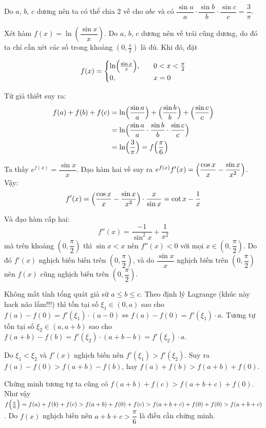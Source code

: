 \begin{solution}
    Do $a$, $b$, $c$ dương nên ta có thể chia 2 vế cho $abc$ và có
    $\dfrac{\sin a}{a} \cdot \dfrac{\sin b}{b} \cdot \dfrac{\sin c}{c} = \dfrac{3}{\pi}$.

    Xét hàm $f(x) = \ln (\dfrac{\sin x}{x})$. Do $a$, $b$, $c$ dương
    nên vế trái cũng dương, do đó ta chỉ cần xét các số trong khoảng
    $(0, \frac{\pi}{2})$ là đủ. Khi đó, đặt

    \[f(x) = \begin{cases} \ln\Bigl(\frac{\sin x}{x}\Bigr), \quad
        & 0 < x < \frac{\pi}{2} \\
        0, \quad & x = 0
    \end{cases}\]

    Từ giả thiết suy ra:
    \begin{align*}
        f(a) + f(b) + f(c) & = \ln \Bigl(\frac{\sin a}{a}\Bigr) 
        + \Bigl(\frac{\sin b}{b}\Bigr) + \Bigl(\frac{\sin c}{c}\Bigr) \\
        & = \ln\Bigl(\frac{\sin a}{a} \cdot \frac{\sin b}{b} 
        \cdot \frac{\sin c}{c}\Bigr) \\
        & = \ln\Bigl(\frac{3}{\pi}\Bigr) = f\Bigl(\frac{\pi}{6}\Bigr)
    \end{align*}

    Ta thấy $e^{f(x)} = \dfrac{\sin x}{x}$. Đạo hàm hai vế suy ra
    $e^{f(x)} f'(x) = \Bigl(\dfrac{\cos x}{x} - \dfrac{\sin x}{x^2}\Bigr)$.
    Vậy:
    \[f'(x) = \Bigl(\frac{\cos x}{x} - \frac{\sin x}{x^2}\Bigr)
    \cdot \frac{x}{\sin x} = \cot x - \frac{1}{x}\]

    Và đạo hàm cấp hai:
    \[f''(x) = \frac{-1}{\sin^2 x} + \frac{1}{x^2}\]
    mà trên khoảng $(0, \dfrac{\pi}{2})$ thì $\sin x < x$
    nên $f''(x) < 0$ với mọi $x \in (0, \dfrac{\pi}{2})$.
    Do đó $f'(x)$ nghịch biến biến trên $(0, \dfrac{\pi}{2})$,
    và do $\dfrac{\sin x}{x}$ nghịch biến trên $(0, \dfrac{\pi}{2})$
    nên $f(x)$ cũng nghịch biến trên $(0, \dfrac{\pi}{2})$.

    Không mất tính tổng quát giả sử $a \leqslant b \leqslant c$.
    Theo định lý Lagrange (khúc này hack não lắm!!!) thì
    tồn tại số $\xi_1 \in (0, a)$ sao cho $f(a) - f(0) = 
    f'(\xi_1) \cdot (a - 0) \Leftrightarrow f(a) - f(0) = f'(\xi_1) \cdot a$.
    Tương tự tồn tại số $\xi_2 \in (a, a+b)$ sao cho
    $f(a+b) - f(b) = f'(\xi_2) \cdot (a + b - b) = f'(\xi_2) \cdot a$.

    Do $\xi_1 < \xi_2$ và $f'(x)$ nghịch biến nên $f'(\xi_1) > f'(\xi_2)$.
    Suy ra $f(a) - f(0) > f(a+b) - f(b)$, hay 
    $f(a) + f(b) > f(a+b) + f(0)$.

    Chứng minh tương tự ta cũng có $f(a+b) + f(c) > f(a+b+c) + f(0)$.
    Như vậy $f\Bigl(\frac{\pi}{6}\Bigr) = 
    f(a) + f(b) + f(c) > f(a+b) + f(0) + f(c) 
    > f(a+b+c) + f(0) + f(0) > f(a + b + c)$. 
    Do $f(x)$ nghịch biến nên $a + b + c > \dfrac{\pi}{6}$ là điều
    cần chứng minh.
\end{solution}

